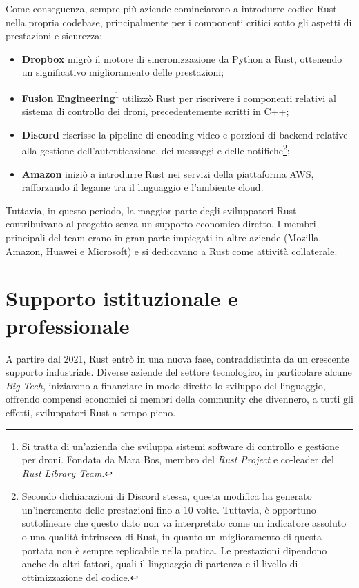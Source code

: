 Come conseguenza, sempre più aziende cominciarono a introdurre codice Rust nella propria codebase, principalmente per i componenti critici sotto 
gli aspetti di prestazioni e sicurezza:
\begin{itemize}
    \item \textbf{Dropbox} migrò il motore di sincronizzazione da Python a Rust, ottenendo un significativo miglioramento delle prestazioni;
    \item \textbf{Fusion Engineering}\footnote{Si tratta di un'azienda che sviluppa sistemi software di controllo e gestione per droni. Fondata da Mara Bos, membro del \textit{Rust Project} e co-leader del \textit{Rust Library Team}.} utilizzò Rust per riscrivere i componenti relativi al sistema di controllo dei droni, precedentemente scritti in C++;
    \item \textbf{Discord} riscrisse la pipeline di encoding video e porzioni di backend relative alla gestione dell'autenticazione, dei messaggi e delle notifiche\footnote{Secondo dichiarazioni di Discord stessa, questa modifica ha generato un'incremento delle prestazioni fino a 10 volte. Tuttavia, è opportuno sottolineare che questo dato non va interpretato come un indicatore assoluto o una qualità intrinseca di Rust, in quanto un miglioramento di questa portata non è sempre replicabile nella pratica. Le prestazioni dipendono anche da altri fattori, quali il linguaggio di partenza e il livello di ottimizzazione del codice.};
    \item \textbf{Amazon} iniziò a introdurre Rust nei servizi della piattaforma AWS, rafforzando il legame tra il linguaggio e l'ambiente cloud.
\end{itemize}
Tuttavia, in questo periodo, la maggior parte degli sviluppatori Rust contribuivano al progetto senza un supporto economico diretto.
I membri principali del team erano in gran parte impiegati in altre aziende (Mozilla, Amazon, Huawei e Microsoft) e si dedicavano a Rust come attività collaterale.

\section{Supporto istituzionale e professionale}
A partire dal 2021, Rust entrò in una nuova fase, contraddistinta da un crescente supporto industriale. Diverse aziende del settore 
tecnologico, in particolare alcune \textit{Big Tech}, iniziarono a finanziare in modo diretto lo sviluppo del linguaggio, offrendo compensi 
economici ai membri della community che divennero, a tutti gli effetti, sviluppatori Rust a tempo pieno.


